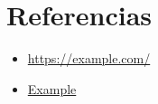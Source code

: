 \pagestyle{plain}
\section{Referencias}

\begin{itemize}
    \item \url{https://example.com/}
    \item \href{https://example.com/}{Example}
\end{itemize}